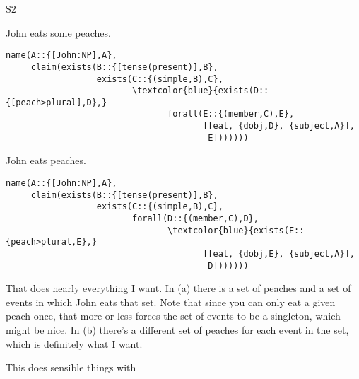 \documentclass[11pt]{article}
\begin{document}
\begin{examples}
\item [S2]
\begin{examples}
\item
John eats some peaches.

\begin{Verbatim}[commandchars=\\\{\}]
name(A::{[John:NP],A},
     claim(exists(B::{[tense(present)],B},
                  exists(C::{(simple,B),C},
                         \textcolor{blue}{exists(D::{[peach>plural],D},}
                                forall(E::{(member,C),E},
                                       [[eat, {dobj,D}, {subject,A}],
                                        E]))))))
\end{Verbatim}

\item
John eats peaches.

\begin{Verbatim}[commandchars=\\\{\}]
name(A::{[John:NP],A},
     claim(exists(B::{[tense(present)],B},
                  exists(C::{(simple,B),C},
                         forall(D::{(member,C),D},
                                \textcolor{blue}{exists(E::{peach>plural,E},}
                                       [[eat, {dobj,E}, {subject,A}],
                                        D]))))))
\end{Verbatim}
\end{examples}
\end{examples}

\noindent
That does nearly everything I want. In (a) there is a set of
peaches and a set of events in which John eats that set. Note that
since you can only eat a given peach once, that more or less forces
the set of events to be a singleton, which might be nice. In
(b) there's a different set of peaches for each event in the
set, which is definitely what I want.

This does sensible things with 
\end{document}
